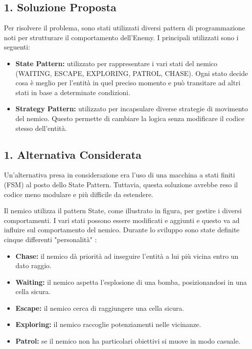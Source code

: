 \documentclass[a4paper,12pt]{report}
\begin{document}
\subsection*{1. Soluzione Proposta}
Per risolvere il problema, sono stati utilizzati diversi pattern di programmazione noti per strutturare il comportamento dell'Enemy. I principali utilizzati sono i seguenti:
\begin{itemize}
 \item \textbf{State Pattern:} utilizzato per rappresentare i vari stati del nemico (WAITING, ESCAPE, EXPLORING, PATROL, CHASE). Ogni stato decide cosa è meglio per l’entità in quel preciso momento e può transitare ad altri stati in base a determinate condizioni.
 \item \textbf{Strategy Pattern:} utilizzato per incapsulare diverse strategie di movimento del nemico. Questo permette di cambiare la logica senza modificare il codice stesso dell’entità.
\end{itemize}

\subsection*{1. Alternativa Considerata}
\par
Un'alternativa presa in considerazione era l'uso di una macchina a stati finiti (FSM) al posto dello State Pattern. Tuttavia, questa soluzione avrebbe reso il codice meno modulare e più difficile da estendere.

\par
Il nemico utilizza il pattern State, come illustrato in figura, per gestire i diversi comportamenti. I vari stati possono essere modificati e aggiunti e questo va ad influire sul comportamento del nemico. Durante lo sviluppo sono state definite cinque differenti "personalità" :
\begin{itemize}
 \item \textbf{Chase:} il nemico dà priorità ad inseguire l’entità a lui più vicina entro un dato raggio.
 \item \textbf{Waiting:} il nemico aspetta l’esplosione di una bomba, posizionandosi in una cella sicura.
 \item \textbf{Escape:}  il nemico cerca di raggiungere una cella sicura.
 \item \textbf{Exploring:}  il nemico raccoglie potenziamenti nelle vicinanze.
 \item \textbf{Patrol:} se il nemico non ha particolari obiettivi si muove in modo casuale.
\end{itemize}
\end{document}
